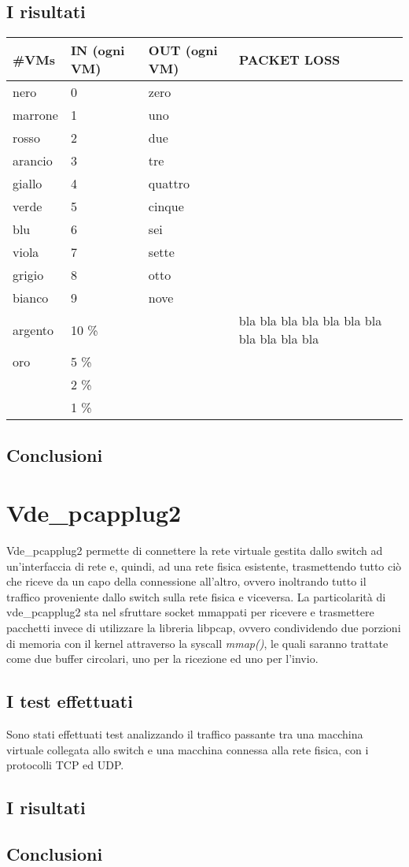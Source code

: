 \subsection{I risultati}
\begin{tabular}{|p{}|p{}|p{}|p{}|}
\hline
#VMs          & IN (ogni VM)        &   OUT (ogni VM)    &   PACKET LOSS    \\
\hline
nero            & 0     & zero          &       \\
marrone         & 1     & uno           &       \\
rosso           & 2     & due           &       \\
arancio         & 3     & tre           &       \\
giallo          & 4     & quattro       &       \\
verde           & 5     & cinque        &       \\
blu             & 6     & sei           &       \\
viola           & 7     & sette         &       \\
grigio          & 8     & otto          &       \\
bianco          & 9     & nove          &       \\
argento         & 10 \% &               & bla bla bla bla bla bla bla bla bla
                                          bla bla \\
oro             & 5 \%  &               &       \\
                & 2 \%  &               &       \\
                & 1 \%  &               &       \\
\hline
\end{tabular}
\subsection{Conclusioni}
\section{Vde\_pcapplug2}
Vde\_pcapplug2 permette di connettere la rete virtuale gestita dallo switch ad un'interfaccia di rete e, quindi, ad una rete fisica esistente, trasmettendo tutto ciò che riceve da un capo della connessione all'altro, ovvero inoltrando tutto il traffico proveniente dallo switch sulla rete fisica e viceversa.
La particolarità di vde\_pcapplug2 sta nel sfruttare socket mmappati per ricevere e trasmettere pacchetti invece di utilizzare la libreria libpcap, ovvero condividendo due porzioni di memoria con il kernel attraverso la syscall {\em mmap()}, le quali saranno trattate come due buffer circolari, uno per la ricezione ed uno per l'invio.
\subsection{I test effettuati}
Sono stati effettuati test analizzando il traffico passante tra una macchina virtuale collegata allo switch e una macchina connessa alla rete fisica, con i protocolli TCP ed UDP.
\subsection{I risultati}
\subsection{Conclusioni}